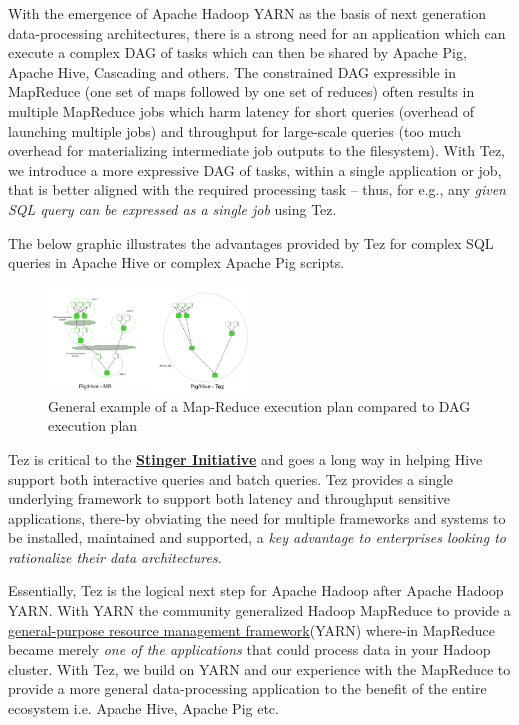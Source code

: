 \documentclass[twocolumn]{article}
\begin{document}
With the emergence of Apache Hadoop YARN as the basis of next generation
data-processing architectures, there is a strong need for an application
which can execute a complex DAG of tasks which can then be shared by
Apache Pig, Apache Hive, Cascading and others. The constrained DAG
expressible in MapReduce (one set of maps followed by one set of
reduces) often results in multiple MapReduce jobs which harm latency for
short queries (overhead of launching multiple jobs) and throughput for
large-scale queries (too much overhead for materializing intermediate
job outputs to the filesystem). With Tez, we introduce a more expressive
DAG of tasks, within a single application or job, that is better aligned
with the required processing task -- thus, for e.g., any \emph{given SQL
query can be expressed as a single job} using Tez.

The below graphic illustrates the advantages provided by Tez for complex
SQL queries in Apache Hive or complex Apache Pig scripts.

\begin{figure}[htb]
        \centering
        \includegraphics[width=0.48\textwidth]{pighivetez.png}
        \caption{General example of a Map-Reduce execution plan compared to DAG execution plan}
        \label{fig02}
\end{figure}

Tez is critical to the
\href{http://hortonworks.com/blog/100x-faster-hive}{\textbf{Stinger
Initiative}} and goes a long way in helping Hive support both
interactive queries and batch queries. Tez provides a single underlying
framework to support both latency and throughput sensitive applications,
there-by obviating the need for multiple frameworks and systems to be
installed, maintained and supported, a \emph{key advantage to
enterprises looking to rationalize their data architectures}.

Essentially, Tez is the logical next step for Apache Hadoop after Apache
Hadoop YARN. With YARN the community generalized Hadoop MapReduce to
provide a
\href{http://hortonworks.com/blog/introducing-apache-hadoop-yarn/}{general-purpose
resource management framework}(YARN) where-in MapReduce became merely
\emph{one of the applications} that could process data in your Hadoop
cluster. With Tez, we build on YARN and our experience with the
MapReduce to provide a more general data-processing application to the
benefit of the entire ecosystem i.e. Apache Hive, Apache Pig etc.
\end{document}
